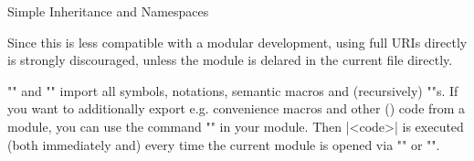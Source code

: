 \begin{sfragment}{Simple Inheritance and Namespaces}
\begin{dangerbox}
\begin{itemize}
     Since this is less compatible with a modular development, using full
     URIs directly is strongly discouraged, unless the module is delared in
     the current file directly.
 \end{itemize} 

  \end{dangerbox}

  \begin{function}{\STEXexport}
    \stexcode"\importmodule" and \stexcode"\usemodule" import all symbols, notations,
    semantic macros and (recursively) \stexcode"\importmodule"s. If you want to
    additionally export e.g. convenience macros and other (\sTeX) code from a module, you
    can use the command \stexcode"" in your module. Then |<code>| is
    executed (both immediately and) every time the current module is opened via
    \stexcode"\importmodule" or \stexcode"\usemodule".
  \end{function}


\end{sfragment}

